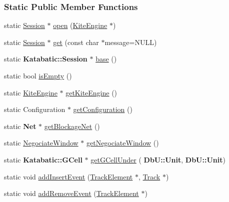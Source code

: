 \subsubsection*{Static Public Member Functions}
\begin{DoxyCompactItemize}
\item 
static \mbox{\hyperlink{classKite_1_1Session}{Session}} $\ast$ \mbox{\hyperlink{classKite_1_1Session_ab8362982a442b5a67f5bd76d6b6caf93}{open}} (\mbox{\hyperlink{classKite_1_1KiteEngine}{Kite\+Engine}} $\ast$)
\item 
static \mbox{\hyperlink{classKite_1_1Session}{Session}} $\ast$ \mbox{\hyperlink{classKite_1_1Session_a76f17c3642eaeba85fa0af5ae9d208b4}{get}} (const char $\ast$message=N\+U\+LL)
\item 
static \textbf{ Katabatic\+::\+Session} $\ast$ \mbox{\hyperlink{classKite_1_1Session_a8a3fc782c34dc075bb2e14209e245494}{base}} ()
\item 
static bool \mbox{\hyperlink{classKite_1_1Session_af337ffd75e4f019ce15302c60715d84b}{is\+Empty}} ()
\item 
static \mbox{\hyperlink{classKite_1_1KiteEngine}{Kite\+Engine}} $\ast$ \mbox{\hyperlink{classKite_1_1Session_a7b6c91acd2c2a7c082b3b006c1bdc91d}{get\+Kite\+Engine}} ()
\item 
static Configuration $\ast$ \mbox{\hyperlink{classKite_1_1Session_a9a7fbadfe526875680f698c76adfb128}{get\+Configuration}} ()
\item 
static \textbf{ Net} $\ast$ \mbox{\hyperlink{classKite_1_1Session_aef6f41b0e8265ad574d1797f46ab9fa8}{get\+Blockage\+Net}} ()
\item 
static \mbox{\hyperlink{classKite_1_1NegociateWindow}{Negociate\+Window}} $\ast$ \mbox{\hyperlink{classKite_1_1Session_a39ebff178f2e0abb9d5a29f485e0bbab}{get\+Negociate\+Window}} ()
\item 
static \textbf{ Katabatic\+::\+G\+Cell} $\ast$ \mbox{\hyperlink{classKite_1_1Session_a27ecb1cf5ffabe1c7901c5c894a5067d}{get\+G\+Cell\+Under}} (\textbf{ Db\+U\+::\+Unit}, \textbf{ Db\+U\+::\+Unit})
\item 
static void \mbox{\hyperlink{classKite_1_1Session_ad4f08dfb62ce626ed72023ce02e7205f}{add\+Insert\+Event}} (\mbox{\hyperlink{classKite_1_1TrackElement}{Track\+Element}} $\ast$, \mbox{\hyperlink{classKite_1_1Track}{Track}} $\ast$)
\item 
static void \mbox{\hyperlink{classKite_1_1Session_aedd573fc951ed93f8ada5b0522813c3a}{add\+Remove\+Event}} (\mbox{\hyperlink{classKite_1_1TrackElement}{Track\+Element}} $\ast$)

\end{DoxyCompactItemize}
